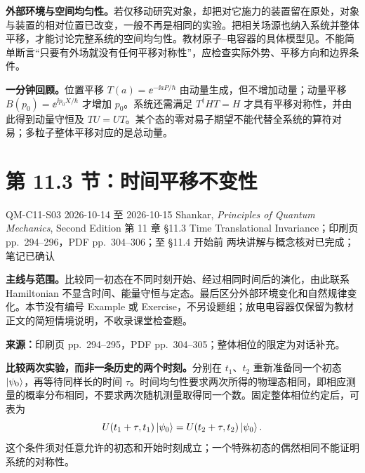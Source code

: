 \textbf{外部环境与空间均匀性。}若仅移动研究对象，却把对它施力的装置留在原处，对象与装置的相对位置已改变，一般不再是相同的实验。把相关场源也纳入系统并整体平移，才能讨论完整系统的空间均匀性。教材原子--电容器的具体模型见。不能简单断言“只要有外场就没有任何平移对称性”，应检查实际外势、平移方向和边界条件。

\textbf{一分钟回顾。}位置平移 $T(a)=\ee^{-\ii aP/\hbar}$ 由动量生成，但不增加动量；动量平移 $B(p_0)=\ee^{\ii p_0X/\hbar}$ 才增加 $p_0$。系统还需满足 $T^\dagger HT=H$ 才具有平移对称性，并由此得到动量守恒及 $TU=UT$。某个态的零对易子期望不能代替全系统的算符对易；多粒子整体平移对应的是总动量。

\section{第 11.3 节：时间平移不变性}
\label{section:QM-C11-S03}
\studymeta
  {QM-C11-S03}
  {2026-10-14 至 2026-10-15}
  {Shankar, \textit{Principles of Quantum Mechanics}, Second Edition}
  {第 11 章 \S 11.3 Time Translational Invariance；印刷页 pp.~294--296，PDF pp.~304--306；至 \S 11.4 开始前}
  {两块讲解与概念核对已完成；笔记已确认}

\textbf{主线与范围。}比较同一初态在不同时刻开始、经过相同时间后的演化，由此联系 Hamiltonian 不显含时间、能量守恒与定态。最后区分外部环境变化和自然规律变化。本节没有编号 Example 或 Exercise，不另设题组；放电电容器仅保留为教材正文的简短情境说明，不收录课堂检查题。

\textbf{来源：}印刷页 pp.~294--295，PDF pp.~304--305；整体相位的限定为对话补充。

\textbf{比较两次实验，而非一条历史的两个时刻。}分别在 $t_1$、$t_2$ 重新准备同一个初态 $\left|\psi_0\right\rangle$，再等待同样长的时间 $\tau$。时间均匀性要求两次所得的物理态相同，即相应测量的概率分布相同，不要求两次随机测量取得同一个数。固定整体相位约定后，可表为
\begin{equation}
  U(t_1+\tau,t_1)\left|\psi_0\right\rangle
    =U(t_2+\tau,t_2)\left|\psi_0\right\rangle.
  \label{eq:QM-C11-S03-equal-elapsed-time}
\end{equation}
这个条件须对任意允许的初态和开始时刻成立；一个特殊初态的偶然相同不能证明系统的对称性。

